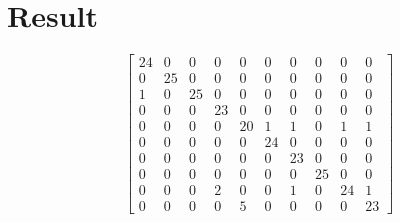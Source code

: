 \documentclass[report.tex]{subfile}
\begin{document}
\section{Result}
\begin{equation*}
    \begin{bmatrix}
        24 & 0 & 0 & 0 & 0 & 0 & 0 & 0 & 0 & 0\\
        0 & 25 & 0 & 0 & 0 & 0 & 0 & 0 & 0 & 0\\
        1 & 0 & 25 & 0 & 0 & 0 & 0 & 0 & 0 & 0\\
        0 & 0 & 0 & 23 & 0 & 0 & 0 & 0 & 0 & 0\\
        0 & 0 & 0 & 0 & 20 & 1 & 1 & 0 & 1 & 1\\
        0 & 0 & 0 & 0 & 0 & 24 & 0 & 0 & 0 & 0\\
        0 & 0 & 0 & 0 & 0 & 0 & 23 & 0 & 0 & 0\\
        0 & 0 & 0 & 0 & 0 & 0 & 0 & 25 & 0 & 0\\
        0 & 0 & 0 & 2 & 0 & 0 & 1 & 0 & 24 & 1\\
        0 & 0 & 0 & 0 & 5 & 0 & 0 & 0 & 0 & 23
    \end{bmatrix}
\end{equation*}
\end{document}
